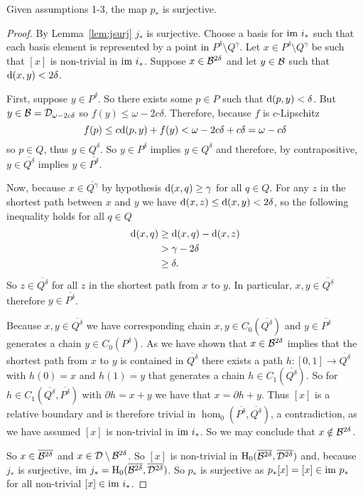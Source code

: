 \begin{lemma}\label{lem:psurj}
    Given assumptions 1-3, the map $p_*$ is surjective.
\end{lemma}
\begin{proof}
    By Lemma~\ref{lem:jsurj} $j_*$ is surjective.
    Choose a basis for $\mathrm{im}~i_*$ such that each basis element is represented by a point in $P^\delta\setminus Q^\gamma$.
    Let $x\in P^\delta\setminus Q^\gamma$ be such that $[x]$ is non-trivial in $\mathrm{im}~i_*$.
    Suppose $x\in{\mathcal{B}}^{2\delta}$ and let $y\in{\mathcal{B}}$ such that $\mathrm{d}(x, y)< 2\delta$.

    First, suppose $y\in P^\delta$.
    So there exists some $p\in P$ such that $\mathrm{d}(p, y) < \delta$.
    But $y\in {\mathcal{B}} = {\mathcal{D}}_{\omega-2c\delta}$ so $f(y)\leq \omega-2c\delta$.
    Therefore, because $f$ is $c$-Lipschitz
    \[ f(p) \leq c\mathrm{d}(p, y) + f(y) < \omega - 2c\delta + c\delta = \omega - c\delta\]
    so $p\in Q$, thus $y\in Q^\delta$.
    So $y\in P^\delta$ implies $y\in Q^\delta$ and therefore, by contrapositive, $y\in\overline{Q^\delta}$ implies $y\in\overline{P^\delta}$.

    Now, because $x\in\overline{Q^\gamma}$ by hypothesis $\mathrm{d}(x, q) \geq \gamma$ for all $q\in Q$.
    For any $z$ in the shortest path between $x$ and $y$ we have $\mathrm{d}(x, z)\leq \mathrm{d}(x, y) < 2\delta$, so the following inequality holds for all $q\in Q$
    \begin{align*}
        \mathrm{d}(x, q) &\geq \mathrm{d}(x, q) - \mathrm{d}(x, z)\\
        &> \gamma - 2\delta\\
        &\geq \delta.
    \end{align*}
    So $z\in \overline{Q^\delta}$ for all $z$ in the shortest path from $x$ to $y$.
    In particular, $x,y\in\overline{Q^\delta}$ therefore $y\in\overline{P^\delta}$.

    Because $x,y\in\overline{Q^\delta}$ we have corresponding chain $x,y\in C_0(\overline{Q^\delta})$ and $y\in\overline{P^\delta}$ generates a chain $y\in C_0(P^\delta)$.
    As we have shown that $x\in {\mathcal{B}}^{2\delta}$ implies that the shortest path from $x$ to $y$ is contained in $\overline{Q^\delta}$ there exists a path $h: [0,1]\to \overline{Q^\delta}$ with $h(0) = x$ and $h(1) = y$ that generates a chain $h\in C_1(\overline{Q^\delta})$.
    So for $h\in C_1(\overline{Q^\delta}, \overline{P^\delta})$ with $\partial h = x + y$ we have that $x = \partial h + y$.
    Thus $[x]$ is a relative boundary and is therefore trivial in $\hom_0(\overline{P^\delta}, \overline{Q^\delta})$, a contradiction, as we have assumed $[x]$ is non-trivial in $\mathrm{im}~i_*$.
    So we may conclude that $x\notin {\mathcal{B}}^{2\delta}$.

    So $x\in\overline{{\mathcal{B}}^{2\delta}}$ and $x\in {\mathcal{D}}\setminus{\mathcal{B}}^{2\delta}$.
    So $[x]$ is non-trivial in $\mathrm{H}_0(\overline{{\mathcal{B}}^{2\delta}},\overline{{\mathcal{D}}^{2\delta}})$ and, because $j_*$ is surjective, $\mathrm{im}~j_* = \mathrm{H}_0(\overline{{\mathcal{B}}^{2\delta}},\overline{{\mathcal{D}}^{2\delta}})$.
    So $p_*$ is surjective as $p_*[x] = [x]\in\mathrm{im}~p_*$ for all non-trivial $[x]\in\mathrm{im}~i_*$.
\end{proof}

